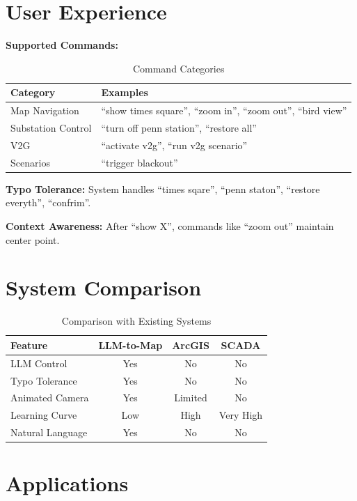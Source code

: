\documentclass[sigconf]{acmart}
\begin{document}
\section{User Experience}

\textbf{Supported Commands:}

\begin{table}[h]
\centering
\caption{Command Categories}
\begin{tabular}{lp{5cm}}
\toprule
\textbf{Category} & \textbf{Examples} \\
\midrule
Map Navigation & ``show times square'', ``zoom in'', ``zoom out'', ``bird view'' \\
Substation Control & ``turn off penn station'', ``restore all'' \\
V2G & ``activate v2g'', ``run v2g scenario'' \\
Scenarios & ``trigger blackout'' \\
\bottomrule
\end{tabular}
\end{table}

\textbf{Typo Tolerance:} System handles ``times sqare'', ``penn staton'', ``restore everyth'', ``confrim''.

\textbf{Context Awareness:} After ``show X'', commands like ``zoom out'' maintain center point.

\section{System Comparison}

\begin{table}[h]
\centering
\caption{Comparison with Existing Systems}
\begin{tabular}{lccc}
\toprule
\textbf{Feature} & \textbf{LLM-to-Map} & \textbf{ArcGIS} & \textbf{SCADA} \\
\midrule
LLM Control & Yes & No & No \\
Typo Tolerance & Yes & No & No \\
Animated Camera & Yes & Limited & No \\
Learning Curve & Low & High & Very High \\
Natural Language & Yes & No & No \\
\bottomrule
\end{tabular}
\end{table}

\section{Applications}
\end{document}
